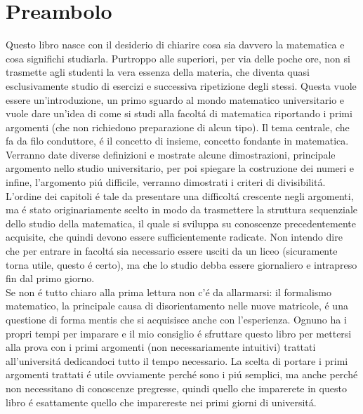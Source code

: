 \documentclass[twoside]{article} %
\newcommand{\blankpage}{\null\thispagestyle{empty}\addtocounter{page}{-1}\newpage}
\begin{document}
	\section*{Preambolo}	
	Questo libro nasce con il desiderio di chiarire cosa sia davvero la matematica e cosa significhi studiarla. Purtroppo alle superiori, per via delle poche ore, non si trasmette agli studenti la vera essenza della materia, che diventa quasi esclusivamente studio di esercizi e successiva ripetizione degli stessi. Questa vuole essere un'introduzione, un primo sguardo al mondo matematico universitario e vuole dare un'idea di come si studi alla facolt\'a di matematica riportando i primi argomenti (che non richiedono preparazione di alcun tipo). Il tema centrale, che fa da filo conduttore, \'e il concetto di insieme, concetto fondante in matematica. Verranno date diverse definizioni e mostrate alcune dimostrazioni, principale argomento nello studio universitario, per poi spiegare la costruzione dei numeri e infine, l'argomento pi\'u difficile, verranno dimostrati i criteri di divisibilit\'a.\\
	L'ordine dei capitoli \'e tale da presentare una difficolt\'a crescente negli argomenti, ma \'e stato originariamente scelto in modo da trasmettere la struttura sequenziale dello studio della matematica, il quale si sviluppa su conoscenze precedentemente acquisite, che quindi devono essere sufficientemente radicate. Non intendo dire che per entrare in facolt\'a sia necessario essere usciti da un liceo (sicuramente torna utile, questo \'e certo), ma che lo studio debba essere giornaliero e intrapreso fin dal primo giorno.\\
	Se non \'e tutto chiaro alla prima lettura non c'\'e da allarmarsi: il formalismo matematico, la principale causa di disorientamento nelle nuove matricole, \'e una questione di forma mentis che si acquisisce anche con l'esperienza. Ognuno ha i propri tempi per imparare e il mio consiglio \'e sfruttare questo libro per mettersi alla prova con i primi argomenti (non necessariamente intuitivi) trattati all'universit\'a dedicandoci tutto il tempo necessario. La scelta di portare i primi argomenti trattati \'e utile ovviamente perch\'e sono i pi\'u semplici, ma anche perch\'e non necessitano di conoscenze pregresse, quindi quello che imparerete in questo libro \'e esattamente quello che imparereste nei primi giorni di universit\'a.	

	\thispagestyle{preambolo}%
	\afterpage{\blankpage}%
	
\end{document}

